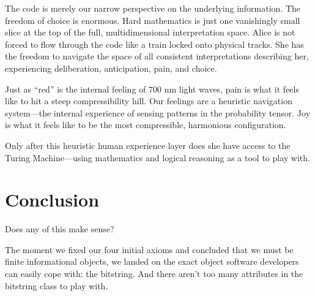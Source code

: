 The code is merely our narrow perspective on the underlying information.
The freedom of choice is enormous.
Hard mathematics is just one vanishingly small slice at the top of the full, multidimensional interpretation space.
Alice is not forced to flow through the code like a train locked onto physical tracks.
She has the freedom to navigate the space of all consistent interpretations describing her, experiencing deliberation, anticipation, pain, and choice.

Just as ``red'' is the internal feeling of $700\text{ nm}$ light waves, pain is what it feels like to hit a steep compressibility hill. Our feelings are a heuristic navigation system---the internal experience of sensing patterns in the probability tensor. Joy is what it feels like to be the most compressible, harmonious configuration. 

Only after this heuristic human experience layer does she have access to the Turing Machine---using mathematics and logical reasoning as a tool to play with.


\section{Conclusion}

Does any of this make sense?

The moment we fixed our four initial axioms and concluded that we must be finite informational objects, we landed on the exact object software developers can easily cope with: the bitstring. And there aren't too many attributes in the bitstring class to play with.

